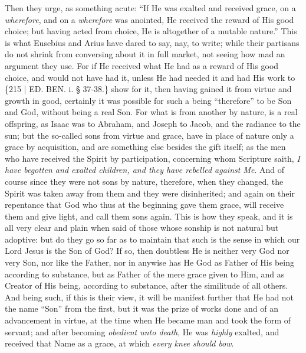 Then they urge, as something
acute: ``If He was exalted and received grace, on a \emph{wherefore},
and on a \emph{wherefore} was anointed, He received the reward of His
good choice; but having acted from choice, He is altogether of a
mutable nature.'' This is what Eusebius and Arius have dared to say,
nay, to write; while their partisans do not shrink from conversing
about it in full market, not seeing how mad an argument they use. For
if He received what He had as a reward of His good choice, and would
not have had it, unless He had needed it and had His work to \{215 | ED.
BEN. i. § 37-38.\} show for it, then having
gained it from virtue and growth in good, certainly it was possible
for such a being ``therefore'' to be Son and God, without being a real
Son. For what is from another by nature, is a real offspring, as Isaac
was to Abraham, and Joseph to Jacob, and the radiance to the sun; but
the so-called sons from virtue and grace, have in place of nature only
a grace by acquisition, and are something else besides the gift
itself; as the men who have received the Spirit by participation,
concerning whom Scripture saith, \emph{I have begotten and exalted
children, and they have rebelled against Me}. And of course since
they were not sons by nature, therefore, when they changed, the Spirit
was taken away from them and they were disinherited; and again on
their repentance that God who thus at the beginning gave them grace,
will receive them and give light, and call them sons again. This is
how they speak, and it is all very clear and plain when said of those
whose sonship is not natural but adoptive: but do they go so far as to
maintain that such is the sense in which our Lord Jesus is the Son of
God? If so, then doubtless He is neither very God nor very Son, nor
like the Father, nor in anywise has He God as Father of His being
according to substance, but as Father of the mere grace given to Him,
and as Creator of His being, according to substance, after the
similitude of all others. And being such, if this is their view, it
will be manifest further that He had not the name ``Son'' from the
first, but it was the prize of works done and of an advancement in
virtue, at the time when He became man and took the form of servant;
and after becoming \emph{obedient unto death}, He was \emph{highly}
exalted, and received that Name as a grace, at which \emph{every knee
should bow}.

